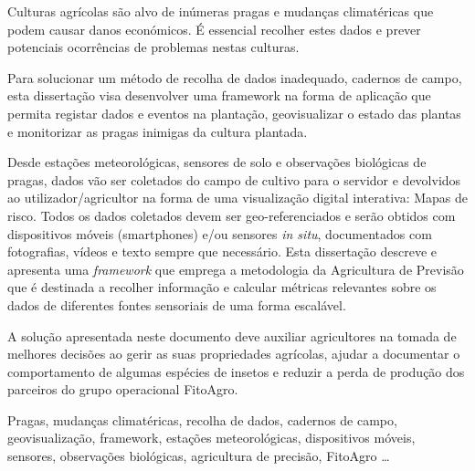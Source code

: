 
Culturas agrícolas são alvo de inúmeras pragas e mudanças climatéricas que podem causar danos económicos. É essencial recolher estes dados e prever potenciais ocorrências de  problemas nestas culturas.

Para solucionar um método de recolha de dados inadequado, cadernos de campo, esta dissertação visa desenvolver uma framework na forma de aplicação que permita registar dados e eventos na plantação, geovisualizar o estado das plantas e monitorizar as pragas inimigas da cultura plantada.

Desde estações meteorológicas, sensores de solo e observações biológicas de pragas, dados vão ser coletados do campo de cultivo para o servidor e devolvidos ao utilizador/agricultor na forma de uma visualização digital interativa: Mapas de risco. Todos os dados coletados devem ser geo-referenciados e serão obtidos com dispositivos móveis (smartphones) e/ou sensores \emph{in situ}, documentados com fotografias, vídeos e texto sempre que necessário. Esta dissertação descreve e apresenta uma \emph{framework} que emprega a metodologia da Agricultura de Previsão que é destinada a recolher informação e calcular métricas relevantes sobre os dados de diferentes fontes sensoriais de uma forma escalável.

A solução apresentada neste documento deve auxiliar agricultores na tomada de melhores decisões ao gerir as suas propriedades agrícolas, ajudar a documentar o comportamento de algumas espécies de insetos e reduzir a perda de produção dos parceiros do grupo operacional FitoAgro. 

\begin{keywords}
Pragas, mudanças climatéricas, recolha de dados, cadernos de campo, geovisualização, framework, estações meteorológicas, dispositivos móveis, sensores, observações biológicas, agricultura de precisão, FitoAgro \ldots
\end{keywords}
